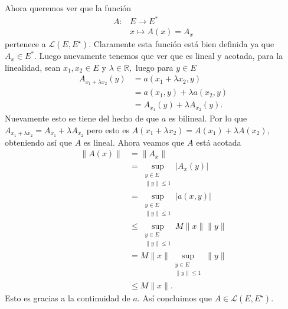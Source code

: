 \begin{itemize}
\begin{sproof}
      Ahora queremos ver que la función
      \begin{align*}
        A:&E\to E^*\\
        &x\mapsto A(x)=A_x
      \end{align*}
      pertenece a $\mathcal{L}\left(E, E^{\star}\right).$ Claramente esta función está bien definida ya que $A_x\in E^*$. Luego nuevamente tenemos que ver que es lineal y acotada, para la linealidad, sean $x_1,x_2\in E$ y $\lambda\in \mathbb{R},$ luego para $y\in E$
      \begin{align*}
        A_{x_1+\lambda x_2}(y)&=a(x_1+\lambda x_2,y)\\
        &=a(x_1,y)+\lambda a(x_2,y)\\
        &=A_{x_1}(y)+\lambda A_{x_2}(y).
      \end{align*}
      Nuevamente esto se tiene del hecho de que $a$ es bilineal. Por lo que $A_{x_1+\lambda x_2}=A_{x_1}+\lambda A_{x_2}$ pero esto es $A(x_1+\lambda x_2)=A(x_1)+\lambda A(x_2)$, obteniendo así que  $A$ es lineal. Ahora veamos que $A$ está acotada
      \begin{align*}
        \|A(x)\|&=\|A_x\|\\
        &=\sup_{\substack{y\in E\\\|y\|\leq 1}}|A_x(y)|\\
        &=\sup_{\substack{y\in E\\\|y\|\leq 1}}|a(x,y)|\\
        &\leq \sup_{\substack{y\in E\\\|y\|\leq 1}}M\|x\|\|y\|\\
        &=M\|x\|\sup_{\substack{y\in E\\\|y\|\leq 1}}\|y\|\\
        &\leq M\|x\|.
      \end{align*}
      Esto es gracias a la continuidad de $a.$ Así concluimos que $A\in\mathcal{L}\left(E, E^{\star}\right).$ 


\end{sproof}
\end{itemize}
